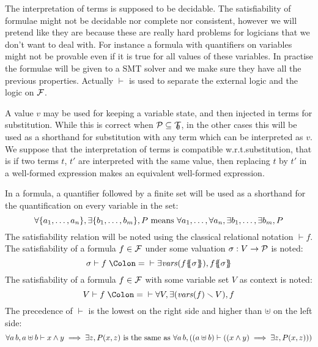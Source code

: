 \documentclass{article}
\begin{document}
The interpretation of terms is supposed to be decidable.
The satisfiability of formulae might not be decidable nor complete nor consistent, however we will pretend like they are because these are really hard problems for logicians that we don't want to deal with.
For instance a formula with quantifiers on variables might not be provable even if it is true for all values of these variables.
In practise the formulae will be given to a SMT solver and we make sure they have all the previous properties.
Actually \(\vdash\) is used to separate the external logic and the logic on \({\mathcal{F}}\).



A value \(v\) may be used for keeping a variable state, and then injected in terms for substitution.
While this is correct when \(\mathcal{P} \subseteq {\mathcal{T}}_{\!\!\emptyset}\), in the other cases this will be used as a shorthand for substitution with any term which can be interpreted as \(v\).
We suppose that the interpretation of terms is compatible w.r.t.\@ substitution, that is if two terms \(t\), \(t'\) are interpreted with the same value, then replacing \(t\) by \(t'\) in a well-formed expression makes an equivalent well-formed expression.
\begin{noti}
 In a formula, a quantifier followed by a finite set will be used as a shorthand for the quantification on every variable in the set:
\[ \forall {\left\{a_1, \dots, a_n\right\}}, \exists {\left\{b_1, \dots, b_m\right\}}, P \text{ means } \forall a_1, \dots, \forall a_n, \exists b_1, \dots, \exists b_m, P \]
 The satisfiability relation will be noted using the classical relational notation \(\vdash f\).
 The satisfiability of a formula \(f \in {\mathcal{F}}\) under some valuation \(\sigma: V \to \mathcal{P}\) is noted:
\[ \sigma \vdash f \defnotation \vdash \exists \fvars{f\psubst{\sigma}}, f\psubst{\sigma} \]
 The satisfiability of a formula \(f \in {\mathcal{F}}\) with some variable set \(V\) as context is noted:
\[ V \vdash f \defnotation \vdash \forall V, \exists\mpar{\fvars{f} \setminus V}, f \]
 The precedence of \(\vdash\) is the lowest on the right side and higher than \(\uplus\) on the left side:
\[ \forall a \, b, a \uplus b \vdash x \wedge y \implies \exists z, P{\left(x,z\right)} \text{ is the same as } \forall a \, b, {\left({\left(a \uplus b\right)} \vdash {\left({\left(x \wedge y\right)} \implies \exists z, P{\left(x,z\right)}\right)}\right)} \]
\end{noti}
\end{document}
